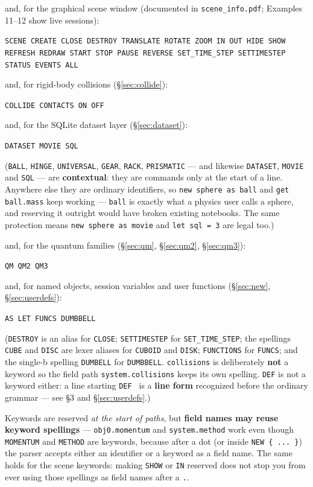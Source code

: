 \documentclass[11pt]{article}
\newcommand{\kw}[1]{\texttt{\uppercase{#1}}}
\newcommand{\code}[1]{\texttt{#1}}
\begin{document}
and, for the graphical scene window (documented in \code{scene\_info.pdf};
Examples 11--12 show live sessions):

\code{SCENE CREATE CLOSE DESTROY TRANSLATE ROTATE ZOOM IN OUT HIDE SHOW
REFRESH REDRAW START STOP PAUSE REVERSE SET\_TIME\_STEP SETTIMESTEP
STATUS EVENTS ALL}

and, for rigid-body collisions (\S\ref{sec:collide}):

\code{COLLIDE CONTACTS ON OFF}

and, for the SQLite dataset layer (\S\ref{sec:dataset}):

\code{DATASET MOVIE SQL}

(\kw{ball}, \kw{hinge}, \kw{universal}, \kw{gear}, \kw{rack},
\kw{prismatic} --- and likewise \kw{dataset}, \kw{movie} and \kw{sql}
--- are \textbf{contextual}: they are commands only at the start of a
line. Anywhere else they are ordinary identifiers, so \code{new sphere
as ball} and \code{get ball.mass} keep working --- \code{ball} is
exactly what a physics user calls a sphere, and reserving it outright
would have broken existing notebooks. The same protection means
\code{new sphere as movie} and \code{let sql = 3} are legal too.)

and, for the quantum families (\S\ref{sec:qm}, \S\ref{sec:qm2},
\S\ref{sec:qm3}):

\code{QM QM2 QM3}

and, for named objects, session variables and user functions
(\S\ref{sec:new}, \S\ref{sec:userdefs}):

\code{AS LET FUNCS DUMBBELL}

(\kw{destroy} is an alias for \kw{close}; \kw{settimestep} for
\kw{set\_time\_step}; the spellings \kw{cube} and \kw{disc} are lexer
aliases for \kw{cuboid} and \kw{disk}; \kw{functions} for \kw{funcs};
and the single-b spelling \kw{dumbell} for \kw{dumbbell}.
\code{collisions} is deliberately \textbf{not} a keyword so the field
path \code{system.collisions} keeps its own spelling. \kw{def} is not
a keyword either: a line starting \code{DEF } is a \textbf{line form}
recognized before the ordinary grammar --- see \S3 and
\S\ref{sec:userdefs}.)

Keywords are reserved \emph{at the start of paths}, but \textbf{field
names may reuse keyword spellings} --- \code{obj0.momentum} and
\code{system.method} work even though \kw{momentum} and \kw{method} are
keywords, because after a dot (or inside \code{NEW \{ ... \}}) the parser
accepts either an identifier or a keyword as a field name. The same
holds for the scene keywords: making \kw{show} or \kw{in} reserved does
not stop you from ever using those spellings as field names after a
\code{.}.
\end{document}
